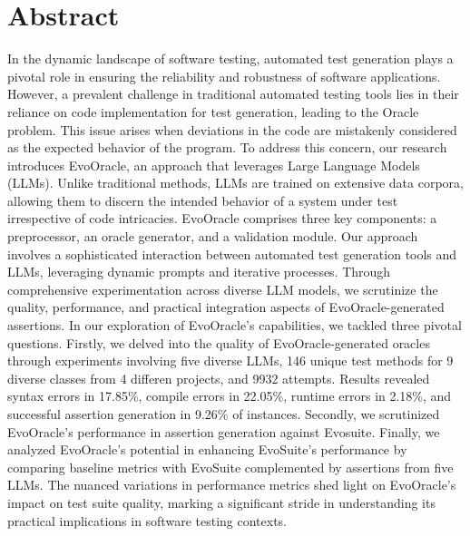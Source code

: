 \chapter*{Abstract} %
\label{abtract}

\vspace{0.4 cm}

In the dynamic landscape of software testing, automated test generation plays a pivotal role in ensuring the reliability and robustness of software applications. However, a prevalent challenge in traditional automated testing tools lies in their reliance on code implementation for test generation, leading to the Oracle problem. This issue arises when deviations in the code are mistakenly considered as the expected behavior of the program. To address this concern, our research introduces EvoOracle, an approach that leverages Large Language Models (LLMs). Unlike traditional methods, LLMs are trained on extensive data corpora, allowing them to discern the intended behavior of a system under test irrespective of code intricacies. EvoOracle comprises three key components: a preprocessor, an oracle generator, and a validation module. Our approach involves a sophisticated interaction between automated test generation tools and LLMs, leveraging dynamic prompts and iterative processes. Through comprehensive experimentation across diverse LLM models, we scrutinize the quality, performance, and practical integration aspects of EvoOracle-generated assertions. In our exploration of EvoOracle's capabilities, we tackled three pivotal questions. Firstly, we delved into the quality of EvoOracle-generated oracles through experiments involving five diverse LLMs, 146 unique test methods for 9 diverse classes from 4 differen projects, and 9932 attempts. Results revealed syntax errors in 17.85\%, compile errors in 22.05\%, runtime errors in 2.18\%, and successful assertion generation in 9.26\% of instances. Secondly, we scrutinized EvoOracle's performance in assertion generation against Evosuite. Finally, we analyzed EvoOracle's potential in enhancing EvoSuite's performance by comparing baseline metrics with EvoSuite complemented by assertions from five LLMs. The nuanced variations in performance metrics shed light on EvoOracle's impact on test suite quality, marking a significant stride in understanding its practical implications in software testing contexts.